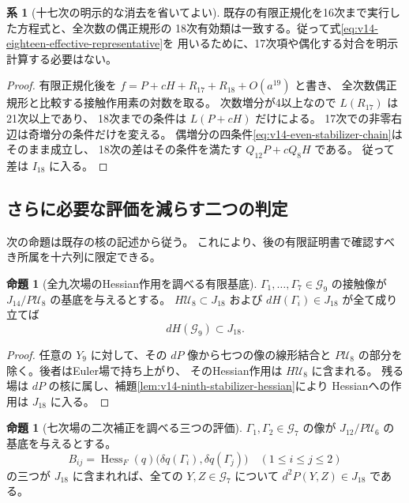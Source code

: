 \documentclass[a4paper,11pt]{ltjsarticle}
\theoremstyle{definition}
\newtheorem{proposition}[theorem]{命題}
\newtheorem{corollary}[theorem]{系}
\begin{document}
\begin{corollary}[十七次の明示的な消去を省いてよい]
\label{cor:v14-eighteen-without-seventeenth}
既存の有限正規化を16次まで実行した方程式と、全次数の偶正規形の
18次有効類は一致する。従って式\eqref{eq:v14-eighteen-effective-representative}を
用いるために、17次項や偶化する対合を明示計算する必要はない。
\end{corollary}

\begin{proof}
有限正規化後を
$f=P+cH+R_{17}+R_{18}+O(a^{19})$ と書き、
全次数偶正規形と比較する接触作用素の対数を取る。
次数増分が4以上なので $L(R_{17})$ は21次以上であり、
18次までの条件は $L(P+cH)$ だけによる。
17次での非零右辺は奇増分の条件だけを変える。
偶増分の四条件\eqref{eq:v14-even-stabilizer-chain}はそのまま成立し、
18次の差はその条件を満たす $Q_{12}P+cQ_8H$ である。
従って差は $I_{18}$ に入る。
\end{proof}

\subsection{さらに必要な評価を減らす二つの判定}

次の命題は既存の核の記述から従う。
これにより、後の有限証明書で確認すべき所属を十六列に限定できる。

\begin{proposition}[全九次場のHessian作用を調べる有限基底]
\label{prop:v14-test-all-ninth-hessian}
$\Gamma_1,\ldots,\Gamma_7\in\mathcal G_9$ の接触像が
$J_{14}/P\mathcal U_8$ の基底を与えるとする。
$H\mathcal U_8\subset J_{18}$ および
$dH(\Gamma_i)\in J_{18}$ が全て成り立てば
\[
 dH(\mathcal G_9)\subset J_{18}.
\]
\end{proposition}

\begin{proof}
任意の $Y_9$ に対して、その $dP$ 像から七つの像の線形結合と
$P\mathcal U_8$ の部分を除く。後者はEuler場で持ち上がり、
そのHessian作用は $H\mathcal U_8$ に含まれる。
残る場は $dP$ の核に属し、補題\ref{lem:v14-ninth-stabilizer-hessian}により
Hessianへの作用は $J_{18}$ に入る。
\end{proof}

\begin{proposition}[七次場の二次補正を調べる三つの評価]
\label{prop:v14-test-seventh-quadratic}
$\Gamma_1,\Gamma_2\in\mathcal G_7$ の像が
$J_{12}/P\mathcal U_6$ の基底を与えるとする。
\[
 B_{ij}=\operatorname{Hess}_F(q)
             \bigl(\delta q(\Gamma_i),\delta q(\Gamma_j)\bigr)
 \quad(1\le i\le j\le2)
\]
の三つが $J_{18}$ に含まれれば、全ての $Y,Z\in\mathcal G_7$ について
$d^2P(Y,Z)\in J_{18}$ である。
\end{proposition}
\end{document}
